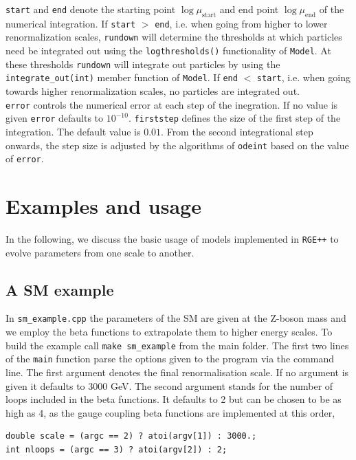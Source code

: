 \documentclass[11pt,a4paper]{article}
\begin{document}
\texttt{start} and \texttt{end} denote the starting point $\log\mu_{\mathrm{start}}$ and end point $\log\mu_{\mathrm{end}}$ of the numerical integration. If \texttt{start} $>$ \texttt{end}, i.e. when going from higher to lower renormalization scales, \texttt{rundown} will determine the thresholds at which particles need be integrated out using the \texttt{logthresholds()} functionality of \texttt{Model}. At these thresholds \texttt{rundown} will integrate out particles by using the \texttt{integrate\_out(int)} member function of \texttt{Model}. If \texttt{end} $<$ \texttt{start}, i.e. when going towards higher renormalization scales, no particles are integrated out.\\
\texttt{error} controls the numerical error at each step of the inegration. If no value is given \texttt{error} defaults to $10^{-10}$. \texttt{firststep} defines the size of the first step of the integration. The default value is $0.01$. From the second integrational step onwards, the step size is adjusted by the algorithms of \texttt{odeint} based on the value of \texttt{error}.

\section{\label{sec::examples}Examples and usage}
In the following, we discuss the basic usage of models implemented in \texttt{RGE++} to evolve parameters from one scale to another.


\subsection{\label{sec::sm_example} A SM example}
In \texttt{sm\_example.cpp} the parameters of the SM are given at the Z-boson mass and we employ the beta functions to extrapolate them to higher energy scales. 
To build the example call \texttt{make sm\_example} from the main folder.
The first two lines of the \texttt{main} function parse the options given to the program via the command line. The first argument denotes the final renormalisation scale. If no argument is given it defaults to 3000 GeV. The
second argument stands for the number of loops included in the beta functions. It defaults to 2 but can be chosen to be as high as 4, as the gauge coupling beta functions are implemented at this order,
\begin{lstlisting}
double scale = (argc == 2) ? atoi(argv[1]) : 3000.;
int nloops = (argc == 3) ? atoi(argv[2]) : 2;
\end{lstlisting}
\end{document}
